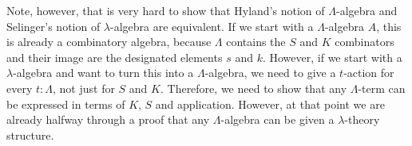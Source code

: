 Note, however, that is very hard to show that Hyland's notion of $ \Lambda $-algebra and Selinger's notion of $ \lambda $-algebra are equivalent. If we start with a $ \Lambda $-algebra $ A $, this is already a combinatory algebra, because $ \Lambda $ contains the $ S $ and $ K $ combinators and their image are the designated elements $ s $ and $ k $. However, if we start with a $ \lambda $-algebra and want to turn this into a $ \Lambda $-algebra, we need to give a $ t $-action for every $ t : \Lambda $, not just for $ S $ and $ K $. Therefore, we need to show that any $ \Lambda $-term can be expressed in terms of $ K $, $ S $ and application. However, at that point we are already halfway through a proof that any $ \Lambda $-algebra can be given a $ \lambda $-theory structure.
